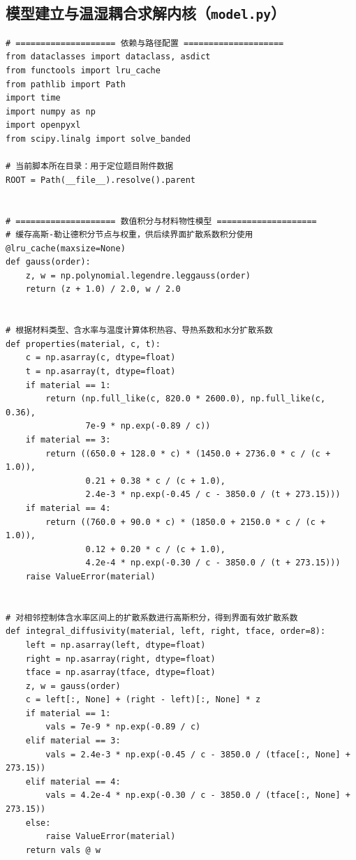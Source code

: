 \subsection{模型建立与温湿耦合求解内核（\texttt{model.py}）}
\begin{Verbatim}[fontsize=\scriptsize,breaklines=true,breakanywhere=true]
# ==================== 依赖与路径配置 ====================
from dataclasses import dataclass, asdict
from functools import lru_cache
from pathlib import Path
import time
import numpy as np
import openpyxl
from scipy.linalg import solve_banded

# 当前脚本所在目录：用于定位题目附件数据
ROOT = Path(__file__).resolve().parent


# ==================== 数值积分与材料物性模型 ====================
# 缓存高斯-勒让德积分节点与权重，供后续界面扩散系数积分使用
@lru_cache(maxsize=None)
def gauss(order):
    z, w = np.polynomial.legendre.leggauss(order)
    return (z + 1.0) / 2.0, w / 2.0


# 根据材料类型、含水率与温度计算体积热容、导热系数和水分扩散系数
def properties(material, c, t):
    c = np.asarray(c, dtype=float)
    t = np.asarray(t, dtype=float)
    if material == 1:
        return (np.full_like(c, 820.0 * 2600.0), np.full_like(c, 0.36),
                7e-9 * np.exp(-0.89 / c))
    if material == 3:
        return ((650.0 + 128.0 * c) * (1450.0 + 2736.0 * c / (c + 1.0)),
                0.21 + 0.38 * c / (c + 1.0),
                2.4e-3 * np.exp(-0.45 / c - 3850.0 / (t + 273.15)))
    if material == 4:
        return ((760.0 + 90.0 * c) * (1850.0 + 2150.0 * c / (c + 1.0)),
                0.12 + 0.20 * c / (c + 1.0),
                4.2e-4 * np.exp(-0.30 / c - 3850.0 / (t + 273.15)))
    raise ValueError(material)


# 对相邻控制体含水率区间上的扩散系数进行高斯积分，得到界面有效扩散系数
def integral_diffusivity(material, left, right, tface, order=8):
    left = np.asarray(left, dtype=float)
    right = np.asarray(right, dtype=float)
    tface = np.asarray(tface, dtype=float)
    z, w = gauss(order)
    c = left[:, None] + (right - left)[:, None] * z
    if material == 1:
        vals = 7e-9 * np.exp(-0.89 / c)
    elif material == 3:
        vals = 2.4e-3 * np.exp(-0.45 / c - 3850.0 / (tface[:, None] + 273.15))
    elif material == 4:
        vals = 4.2e-4 * np.exp(-0.30 / c - 3850.0 / (tface[:, None] + 273.15))
    else:
        raise ValueError(material)
    return vals @ w




\end{Verbatim}
